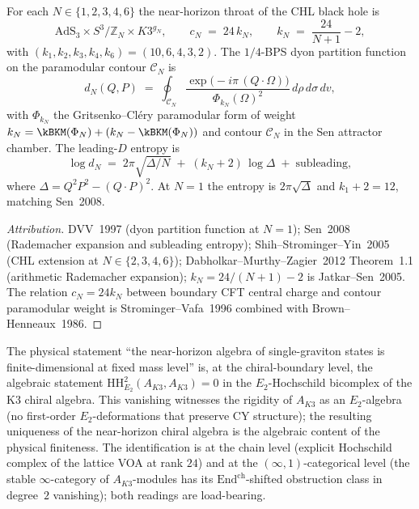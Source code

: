 \begin{theorem}
\label{thm:plat-AdS3}
For each $N \in \{1, 2, 3, 4, 6\}$ the near-horizon throat of the CHL black hole is
\[
 \mathrm{AdS}_3 \times S^3/\mathbb{Z}_N \times K3^{g_N}, \qquad c_N \;=\; 24\, k_N, \qquad k_N \;=\; \frac{24}{N + 1} - 2,
\]
with $(k_1, k_2, k_3, k_4, k_6) = (10, 6, 4, 3, 2)$. The $1/4$-BPS dyon partition function on the paramodular contour $\mathcal{C}_N$ is
\[
 d_N(Q, P) \;=\; \oint_{\mathcal{C}_N} \frac{\exp\!\bigl(-i\pi\,(Q \cdot \Omega)\bigr)}{\Phi_{k_N}(\Omega)^2}\, d\rho\, d\sigma\, dv,
\]
with $\Phi_{k_N}$ the Gritsenko--Cl\'ery paramodular form of weight $k_N = \kBKM(\Phi_N) + (k_N - \kBKM(\Phi_N))$ and contour $\mathcal{C}_N$ in the Sen attractor chamber. The leading-$D$ entropy is
\[
 \log d_N \;=\; 2\pi\sqrt{\Delta/N} \;+\; (k_N + 2)\,\log\Delta \;+\; \text{subleading},
\]
where $\Delta = Q^2 P^2 - (Q \cdot P)^2$. At $N = 1$ the entropy is $2\pi\sqrt{\Delta}$ and $k_1 + 2 = 12$, matching Sen~2008.
\end{theorem}

\begin{proof}[Attribution]
DVV~1997 (dyon partition function at $N = 1$); Sen~2008 (Rademacher expansion and subleading entropy); Shih--Strominger--Yin~2005 (CHL extension at $N \in \{2, 3, 4, 6\}$); Dabholkar--Murthy--Zagier~2012 Theorem~1.1 (arithmetic Rademacher expansion); $k_N = 24/(N + 1) - 2$ is Jatkar--Sen~2005. The relation $c_N = 24 k_N$ between boundary CFT central charge and contour paramodular weight is Strominger--Vafa~1996 combined with Brown--Henneaux~1986.
\end{proof}

\begin{remark}
\label{rem:k3e-platonic-graviton-finiteness-HH2}
The physical statement ``the near-horizon algebra of single-graviton states is finite-dimensional at fixed mass level'' is, at the chiral-boundary level, the algebraic statement $\mathrm{HH}^2_{E_2}(A_{K3}, A_{K3}) = 0$ in the $E_2$-Hochschild bicomplex of the K3 chiral algebra. This vanishing witnesses the rigidity of $A_{K3}$ as an $E_2$-algebra (no first-order $E_2$-deformations that preserve CY structure); the resulting uniqueness of the near-horizon chiral algebra is the algebraic content of the physical finiteness. The identification is at the chain level (explicit Hochschild complex of the lattice VOA at rank $24$) and at the $(\infty, 1)$-categorical level (the stable $\infty$-category of $A_{K3}$-modules has its $\mathrm{End}^{\mathrm{ch}}$-shifted obstruction class in degree~$2$ vanishing); both readings are load-bearing.
\end{remark}

